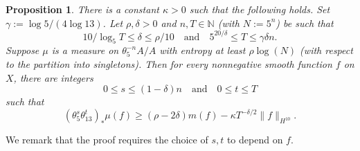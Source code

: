\documentclass[11pt]{amsart}
\newtheorem{proposition}[lemma]{Proposition}
\theoremstyle{definition}
\begin{document}
\begin{proposition}\label{cor:discreteblmv}
There is a constant $\kappa>0$ such that the following holds.  Set $\gamma:=\log 5/(4\log 13)$.  Let $\rho,\delta>0$ and $n,T \in \mathbb{N}$ (with $N:=5^n$) be such that $$10/\log_5 T \le \delta \le \rho/10 \quad \text{and} \quad 5^{20/\delta} \le T \le \gamma \delta n.$$
Suppose $\mu$ is a measure on $\theta_5^{-n}A/A$ with entropy at least $\rho \log(N)$ (with respect to the partition into singletons).  Then for every nonnegative smooth function $f$ on $X$, there are integers $$0 \leq s \leq (1-\delta)n \quad \text{and} \quad 0 \leq t \leq T$$
such that
$$(\theta_5^s \theta_{13}^t)_*\mu(f) \ge (\rho - 2\delta)m(f) - \kappa T^{-\delta/2} \|f\|_{H^{10}}.$$
\end{proposition}
We remark that the proof requires the choice of $s,t$ to depend on $f$.
\end{document}
